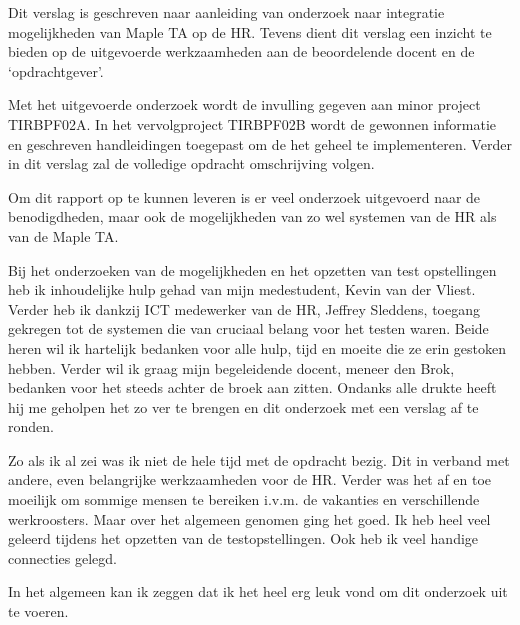 
Dit verslag is geschreven naar aanleiding van onderzoek naar integratie mogelijkheden van Maple TA op de HR. Tevens dient dit verslag een inzicht te bieden op de uitgevoerde werkzaamheden aan de beoordelende docent en de `opdrachtgever'.

Met het uitgevoerde onderzoek wordt de invulling gegeven aan minor project TIRBPF02A. In het vervolgproject TIRBPF02B wordt de gewonnen informatie en geschreven handleidingen toegepast om de het geheel te implementeren. Verder in dit verslag zal de volledige opdracht omschrijving volgen. 

Om dit rapport op te kunnen leveren is er veel onderzoek uitgevoerd naar de benodigdheden, maar ook de mogelijkheden van zo wel systemen van de HR als van de Maple TA. 

Bij het onderzoeken van de mogelijkheden en het opzetten van test opstellingen heb ik inhoudelijke hulp gehad van mijn medestudent, Kevin van der Vliest. Verder heb ik dankzij ICT medewerker van de HR, Jeffrey Sleddens, toegang gekregen tot de systemen die van cruciaal belang voor het testen waren. Beide heren wil ik hartelijk bedanken voor alle hulp, tijd en moeite die ze erin gestoken hebben. Verder wil ik graag mijn begeleidende docent, meneer den Brok, bedanken voor het steeds achter de broek aan zitten. Ondanks alle drukte heeft hij me geholpen het zo ver te brengen en dit onderzoek met een verslag af te ronden.

Zo als ik al zei was ik niet de hele tijd met de opdracht bezig. Dit in verband met andere, even belangrijke werkzaamheden voor de HR. Verder was het af en toe moeilijk om sommige mensen te bereiken i.v.m. de vakanties en verschillende werkroosters. Maar over het algemeen genomen ging het goed. Ik heb heel veel geleerd tijdens het opzetten van de testopstellingen. Ook heb ik veel handige connecties gelegd.

In het algemeen kan ik zeggen dat ik het heel erg leuk vond om dit onderzoek uit te voeren.